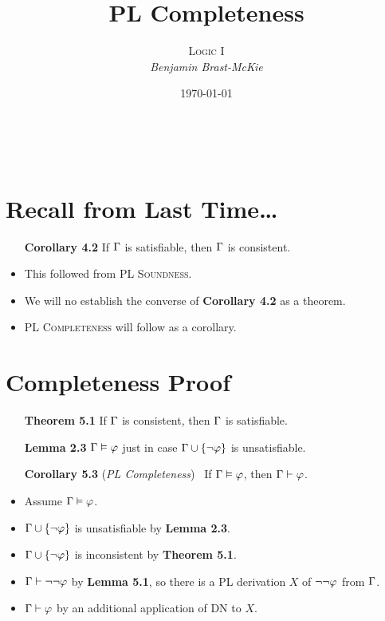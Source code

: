 \documentclass[a4paper, 11pt]{article} %
\title{\textbf{PL Completeness}} %
\author{\textsc{Logic I}\\ \em Benjamin Brast-McKie} %
\date{\today} %
\makeatletter
\renewcommand{\maketitle}{
\begin{flushright}
{\LARGE\@title}

\vspace{10pt}

{\@author}
\\ \@date
\end{flushright}

\vspace{-40pt}

}
\makeatother
\begin{document}
\maketitle %

\thispagestyle{empty}


\section*{Recall from Last Time\ldots}

\begin{itemize}
  \item[\bf Corollary 4.2] If $\Gamma$ is satisfiable, then $\Gamma$ is consistent.
    \item This followed from \textsc{PL Soundness}.
    \item We will no establish the converse of \textbf{Corollary 4.2} as a theorem.
    \item \textsc{PL Completeness} will follow as a corollary.
\end{itemize}




\section*{Completeness Proof}

\begin{itemize}
  \item[\bf Theorem 5.1] If $\Gamma$ is consistent, then $\Gamma$ is satisfiable.
  \item[\bf Lemma 2.3] $\Gamma \vDash \varphi$ just in case $\Gamma \cup \lbrace\neg \varphi\rbrace$ is unsatisfiable. 
  \item[\bf Corollary 5.3] (\textit{PL Completeness})~ If $\Gamma\vDash\varphi$, then $\Gamma\vdash\varphi$.
  \item Assume $\Gamma\vDash\varphi$.
  \item $\Gamma\cup\lbrace\neg\varphi\rbrace$ is unsatisfiable by \textbf{Lemma 2.3}.
  \item $\Gamma\cup\lbrace\neg\varphi\rbrace$ is inconsistent by \textbf{Theorem 5.1}.
  \item $\Gamma\vdash\neg\neg\varphi$ by \textbf{Lemma 5.1}, so there is a PL derivation $X$ of $\neg \neg \varphi$ from $\Gamma$.
  \item $\Gamma\vdash\varphi$ by an additional application of DN to $X$.
\end{itemize}
\end{document}
